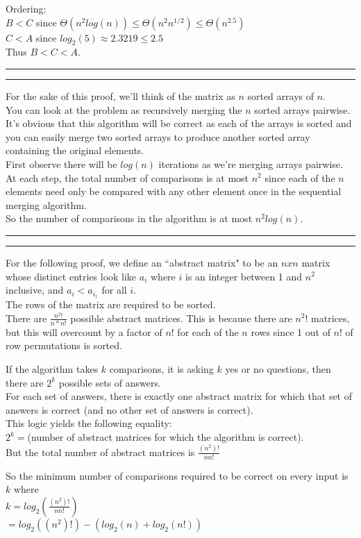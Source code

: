 \documentclass[11pt,letterpaper]{article}
\newcommand{\question}[1] {\vspace{.25in} \hrule\vspace{0.5em}
\noindent{\bf #1} \vspace{0.5em}
\hrule \vspace{.10in}}
\begin{document}
Ordering: \\
$B < C$ since $\Theta(n^{2} log(n)) \leq \Theta(n^{2} n^{1/2}) \leq \Theta(n^{2.5})$\\
$C < A$ since $log_2(5) \approx 2.3219 \leq 2.5$\\
Thus $B < C < A$.


\question{2a}
For the sake of this proof, we'll think of the matrix as $n$ sorted arrays of $n$. \\
You can look at the problem as recursively merging the $n$ sorted arrays pairwise.\\
It's obvious that this algorithm will be correct as each of the arrays is sorted and you can easily
merge two sorted arrays to produce another sorted array containing the original elements.\\
First observe there will be $log(n)$ iterations as we're merging arrays pairwise.\\
At each step, the total number of comparisons is at most $n^2$ since each of the $n$ elements need only be compared with any other element once in the sequential merging algorithm.\\
So the number of comparisons in the algorithm is at most $n^2 log(n)$.

\question{2b}
For the following proof, we define an ``abstract matrix" to be an $n x n$  matrix whose distinct entries look like $a_i$ where $i$ is an integer between 1 and $n^2$ inclusive, and $a_i < a_{i_1}$ for all $i$.\\
The rows of the matrix are required to be sorted.\\
There are $\frac{n^2!}{n * n!}$ possible abstract matrices. This is because there are $n^2!$ matrices, but this will overcount by a factor of $n!$ for each of the $n$ rows since 1 out of $n!$ of row permutations is sorted.

If the algorithm takes $k$ comparisons, it is asking $k$ yes or no questions, then there are $2^k$ possible sets of answers.\\
For each set of answers, there is exactly one abstract matrix for which that set of answers is correct (and no other set of answers is correct).\\
This logic yields the following equality:\\
$2^k = $(number of abstract matrices for which the algorithm is correct).\\
But the total number of abstract matrices is $\frac{(n^2)!}{n n!}$

So the minimum number of comparisons required to be correct on every input is $k$ where\\
$k = log_2(\frac{(n^2)!}{n n!})$\\
$  = log_2((n^2)!) - (log_2(n) + log_2(n!))$
\end{document}
